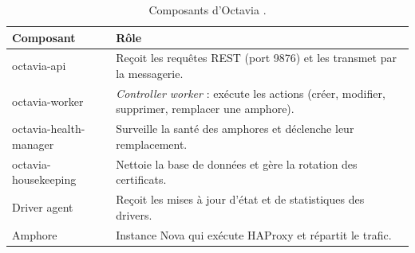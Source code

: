 \begin{table}[!ht]
\centering
\renewcommand{\arraystretch}{1.3}
\begin{tabular}{@{}>{\raggedright\arraybackslash\ttfamily\small}p{4.0cm}>{\raggedright\arraybackslash}p{11.5cm}@{}}
\toprule
\textrm{\textbf{Composant}} & \textbf{Rôle} \\
\midrule
octavia-api & Reçoit les requêtes REST (port 9876) et les transmet par la messagerie. \\
octavia-worker & \emph{Controller worker} : exécute les actions (créer, modifier, supprimer, remplacer une amphore). \\
octavia-health-manager & Surveille la santé des amphores et déclenche leur remplacement. \\
octavia-housekeeping & Nettoie la base de données et gère la rotation des certificats. \\
Driver agent & Reçoit les mises à jour d'état et de statistiques des drivers. \\
Amphore & Instance Nova qui exécute HAProxy et répartit le trafic. \\
\bottomrule
\end{tabular}
\caption{Composants d'Octavia \parencite{octavia-intro, octavia-install}.}
\label{tab:oc-composants}
\end{table}

